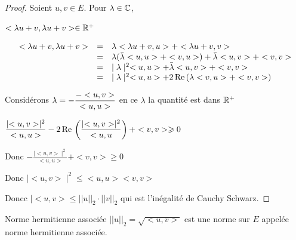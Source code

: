 \begin{proof}
    Soient $u, v \in E$. 
    Pour $\lambda \in \mathbb{C}$, 

    $<\lambda u + v, \lambda u + v> \in \mathbb{R}^+ $

    $$
    \begin{array}{rcl}
        <\lambda u + v, \lambda u + v> & = & \lambda <\lambda u + v, u > + <\lambda u + v, v> \\
        \space & = & \lambda (\bar \lambda <u, u> + <v, u>) + \bar \lambda <u, v> + <v, v> \\
        \space & = & \mid \lambda \mid^2 <u, u> + \bar \lambda <u, v> + <v, v> \\
        \space & = & \mid \lambda \mid^2 <u, u> + 2 \operatorname{Re} \,(\lambda <v, u>  + <v, v>) \\
    \end{array}
    $$

    Considérons $\displaystyle \lambda = - \frac{-<u, v>}{<u, u>}$ en ce $\lambda$ la quantité est dans
    $\mathbb{R}^+$

    $\displaystyle \frac{\mid <u, v>\mid^2}{<u, u>} - 2 \operatorname{Re} \, \left(\frac{\mid <u, v>\mid^2}{<u, u}\right) + <v, v> \geqslant 0$

    Donc $\displaystyle - \frac{\mid <u, v>\mid ^2}{<u, u>} + <v, v> \geqslant 0$

    Donc $\mid <u, v> \mid^2 \leqslant <u, u> <v, v>$

    Doncc $\mid <u, v> \leqslant ||u||_2 \cdot ||v||_2$ qui est l'inégalité de Cauchy Schwarz. 

\end{proof}

\begin{theoreme}{Norme hermitienne associée}{}
    $||u||_2 = \sqrt{<u, v>}$ est une norme sur $E$ appelée norme hermitienne associée. 
\end{theoreme}

